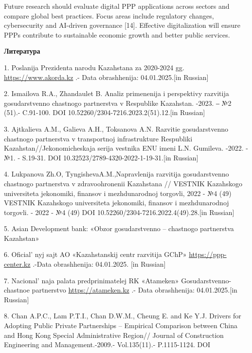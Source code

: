 \begin{multicols}{2}
Future research should evaluate digital PPP applications across sectors
and compare global best practices. Focus areas include regulatory
changes, cybersecurity and AI-driven governance {[}14{]}. Effective
digitalization will ensure PPPs contribute to sustainable economic
growth and better public services.
\end{multicols}

\begin{center}
{\bfseries Литература}
\end{center}

\begin{references}
1. Poslanija Prezidenta narodu Kazahstana za 2020-2024 gg.
\href{https://www.akorda.kz/ru/addresses}{https://www.akorda.kz} .- Data obrashhenija: 04.01.2025.{[}in
Russian{]}

2. Ismailova R.A., Zhandaulet B. Analiz primenenija i perspektivy
razvitija gosudarstvenno chastnogo partnerstva v Respublike Kazahstan.
-2023. ‒ №2 (51).- C.91-100. DOI 10.52260/2304-7216.2023.2(51).12.{[}in
Russian{]}

3. Ajtkalieva A.M., Galieva A.H., Toksanova A.N. Razvitie gosudarstvenno
chastnogo partnerstva v transportnoj infrastrukture Respubliki
Kazahstan//Jekonomicheskaja serija vestnika ENU imeni L.N. Gumileva.
-2022. -№1. - S.19-31. DOI 10.32523/2789-4320-2022-1-19-31.{[}in
Russian{]}

4. Lukpanova Zh.O, TyngishevaA.M.,Napravlenija razvitija gosudarstvenno
chastnogo partnerstva v zdravoohronenii Kazahstana // VESTNIK Kazahskogo
universiteta jekonomiki, finansov i mezhdunarodnoj torgovli, 2022 - №4
(49) VESTNIK Kazahskogo universiteta jekonomiki, finansov i
mezhdunarodnoj torgovli. - 2022 - №4 (49) DOI
10.52260/2304-7216.2022.4(49).28.{[}in Russian{]}

5. Asian Development bank: «Obzor gosudarstvenno -- chastnogo
partnerstva Kazahstan»

6. Oficial' nyj sajt AO «Kazahstanskij centr razvitija
GChP» \href{https://ppp-center.kz/}{https://ppp-center.kz} .-Data obrashhenija: 04.01.2025. {[}in
Russian{]}

7. Nacional' naja palata predprinimatelej RK «Atameken»
Gosudarstvenno-chastnoe partnerstvo
\href{https://atameken.kz/ru/services/18-gosudarstvenno-chastnoe-partnerstvo}{https://atameken.kz} .- Data
obrashhenija: 04.01.2025.{[}in Russian{]}

8. Chan A.P.C., Lam P.T.I., Chan D.W.M., Cheung E. and Ke Y.J. Drivers
for Adopting Public Private Partnerships -- Empirical Comparison between
China and Hong Kong Special Administrative Region// Journal of
Construction Engineering and Management.-2009.- Vol.135(11).-
P.1115-1124. DOI
\href{http://dx.doi.org/10.1061/(ASCE)CO.1943-7862.0000088}{}


\end{references}
